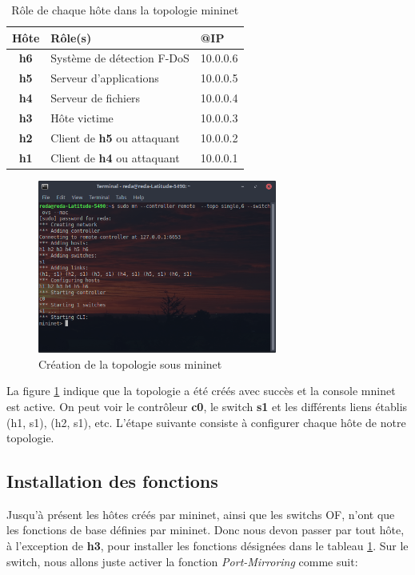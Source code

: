 \begin{table}
\begin{center}
\begin{tabular}{  | c || m{5cm} | m{3cm} | }
\hline
\rowcolor[rgb]{0.85,0.85,0.85}
Hôte & Rôle(s) & @IP\\
\hline
\textbf{h6} & Système de détection F-DoS & 10.0.0.6\\
\hline
\textbf{h5} & Serveur d'applications & 10.0.0.5\\
\hline
\textbf{h4} & Serveur de fichiers & 10.0.0.4\\
\hline
\textbf{h3} & Hôte victime & 10.0.0.3\\
\hline
\textbf{h2} & Client de \textbf{h5} ou attaquant & 10.0.0.2\\
\hline
\textbf{h1} & Client de \textbf{h4} ou attaquant & 10.0.0.1\\
\hline
\end{tabular}
\caption{Rôle de chaque hôte dans la topologie mininet}
\label{table:nodes}
\end{center}
\end{table}

\begin{figure}[h]
\centering
\includegraphics[width=0.7\textwidth]{Figures/simulation/mininet/start}
\decoRule
\caption{Création de la topologie sous mininet}
\label{fig:topologie}
\end{figure}

\newpage
La figure \ref{fig:topologie} indique que la topologie a été créés avec succès et la console mninet est active. On peut voir le contrôleur \textbf{c0}, le switch \textbf{s1} et les différents liens établis (h1, s1), (h2, s1), etc. L'étape suivante consiste à configurer chaque hôte de notre topologie.

\subsection{Installation des fonctions}
Jusqu'à présent les hôtes créés par mininet, ainsi que les switchs OF, n'ont que les fonctions de base définies par mininet. Donc nous devon passer par tout hôte, à l'exception de \textbf{h3}, pour installer les fonctions désignées dans le tableau \ref{table:nodes}. Sur le switch, nous allons juste activer la fonction \textit{Port-Mirroring} comme suit:

